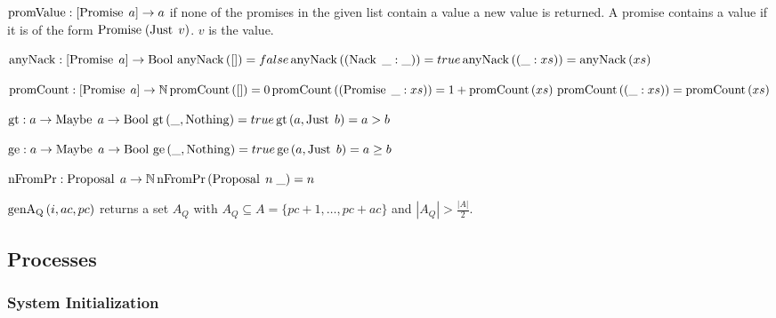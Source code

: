 $\operatorname{promValue} : [\operatorname{Promise}\; a] \to a$ if none of the promises in the given list contain a value a new value is returned.
A promise contains a value if it is of the form $\operatorname{Promise}\; (\operatorname{Just}\; v)$.
$v$ is the value.

$\operatorname{anyNack} : [\operatorname{Promise}\; a] \to \operatorname{Bool}\\
\operatorname{anyNack}\left([]\right) = false\\
\operatorname{anyNack}\left(\left(\operatorname{Nack}\; \_: \_\right)\right) = true\\
\operatorname{anyNack}\left(\left(\_:xs\right)\right) = \operatorname{anyNack}\left(xs\right)$

$\operatorname{promCount} : [\operatorname{Promise}\; a] \to \mathbb{N}\\
\operatorname{promCount}\left([]\right) = 0\\
\operatorname{promCount}\left(\left(\operatorname{Promise}\; \_:xs\right)\right) = 1 + \operatorname{promCount}\left(xs\right)\\
\operatorname{promCount}\left(\left(\_:xs\right)\right) = \operatorname{promCount}\left(xs\right)$

$\operatorname{gt}: a \to \operatorname{Maybe}\; a \to \operatorname{Bool}\\
\operatorname{gt}\left(\_, \operatorname{Nothing}\right) = true\\
\operatorname{gt}\left(a, \operatorname{Just}\; b\right) = a > b$

$\operatorname{ge}: a \to \operatorname{Maybe}\; a \to \operatorname{Bool}\\
\operatorname{ge}\left(\_, \operatorname{Nothing}\right) = true\\
\operatorname{ge}\left(a, \operatorname{Just}\; b\right) = a \ge b$

$\operatorname{nFromPr} : \operatorname{Proposal}\; a \to \mathbb{N}\\
\operatorname{nFromPr}\left(\operatorname{Proposal}\; n\; \_ \right) = n$

$\operatorname{genA_Q}\left(i, ac, pc\right)$ returns a set $A_Q$ with $A_Q \subseteq A = \{pc + 1, \dots, pc + ac\}$ and $|A_Q| > \frac{|A|}{2}$.

\subsection{Processes}
\newcommand{\Sys}[3]{\operatorname{Sys}\left(#1, #2, #3\right)}
\newcommand{\Pa}[0]{\operatorname{P^a}}
\newcommand{\Pp}[0]{\operatorname{P^p}}
\newcommand{\PaCont}[0]{\operatorname{P^a_{cont}}}

\newcommand{\PpInit}[4]{\operatorname{P^p_{init}}\left(#1, #2, #3, #4\right)}
\newcommand{\PaInit}[4]{\operatorname{P^a_{init}}\left(#1, #2, #3, #4\right)}

\subsubsection{System Initialization}
\newcommand{\SessionRequest}[3]{\overline{#1}\left[#2\right]\left(#3\right)}
\newcommand{\SessionAccept}[3]{#1\left[#2\right]\left(#3\right)}
\newcommand{\ParallelFor}[1]{\Pi_{#1}\;}

